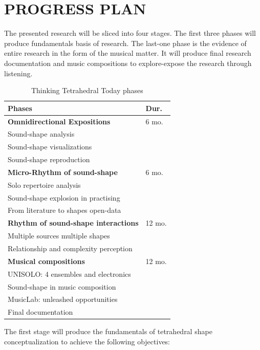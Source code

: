 \documentclass[
	12pt,
	a4paper,
	twocolumn
	]{article}
\begin{document}
\section*{PROGRESS PLAN}

The presented research will be sliced into four stages. The first three phases will produce fundamentals basis of research. The last-one phase is the evidence of entire research in the form of the musical matter. It will produce final research documentation and music compositions to explore-expose the research through listening.

\begin{table}[htp]
\begin{center}
\begin{tabular}{ll}
\textbf{Phases} & \textbf{Dur.} \\
\hline
\textbf{Omnidirectional Expositions} & 6 mo. \\
Sound-shape analysis & \\
Sound-shape visualizations & \\
Sound-shape reproduction & \\
\hline
\textbf{Micro-Rhythm of sound-shape} & 6 mo. \\
Solo repertoire analysis & \\
Sound-shape explosion in practising & \\
From literature to shapes open-data & \\
\hline
\textbf{Rhythm of sound-shape interactions} & 12 mo. \\
Multiple sources multiple shapes & \\
Relationship and complexity perception & \\
\hline
\textbf{Musical compositions} & 12 mo. \\
UNISOLO: 4 ensembles and electronics & \\
Sound-shape in music composition & \\
MusicLab: unleashed opportunities & \\
Final documentation
\end{tabular}
\label{timesheet}
\caption{Thinking Tetrahedral Today phases}
\end{center}
\end{table}%

The first stage will produce the fundamentals of tetrahedral shape conceptualization to achieve the following objectives:
\end{document}
